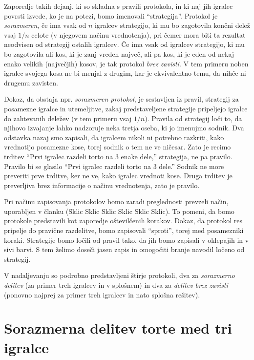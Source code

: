 \documentclass[a4paper,12pt]{article}
\begin{document}
Zaporedje takih dejanj, ki so skladna s pravili protokola, in ki naj jih igralec povrsti izvede, ko je na potezi, bomo imenovali ``strategija''. Protokol je {\em sorazmeren}, če ima vsak od $n$ igralcev strategijo, ki mu bo zagotovila končni delež vsaj $1/n$ celote (v njegovem načinu vrednotenja), pri čemer mora biti ta rezultat neodvisen od strategij ostalih igralcev. Če ima vsak od igralcev strategijo, ki mu bo zagotovila ali kos, ki je zanj vreden največ, ali pa kos, ki je eden od nekaj enako velikih (največjih) kosov, je tak protokol {\em brez zavisti}. V tem primeru noben igralec svojega kosa ne bi menjal z drugim, kar je ekvivalentno temu, da nihče ni drugemu zavisten.

Dokaz, da obstaja npr. {\em sorazmeren protokol}, je sestavljen iz pravil, strategij za posamezne igralce in utemeljitve, zakaj predstaveljene strategije pripeljejo igralce do zahtevanih deležev (v tem primeru vsaj $1/n$). Pravila od strategij loči to, da njihovo izvajanje lahko nadzoruje neka tretja oseba, ki jo imenujmo sodnik. Dva odstavka nazaj smo zapisali, da igralcem nikoli ni potrebno razkriti, kako vrednotijo posamezne kose, torej sodnik o tem ne ve ničesar. Zato je recimo trditev ``Prvi igralec razdeli torto na 3 enake dele,'' strategija, ne pa pravilo. Pravilo bi se glasilo ``Prvi igralec razdeli torto na 3 dele.'' Sodnik ne more preveriti prve trditve, ker ne ve, kako igralec vrednoti kose. Druga trditev je preverljiva brez informacije o načinu vrednotenja, zato je pravilo.

Pri načinu zapisovanja protokolov bomo zaradi preglednosti prevzeli način, uporabljen v članku (Sklic Sklic Sklic Sklic Sklic Sklic). To pomeni, da bomo protokole predstavili kot zaporedje oštevilčenih korakov. Dokaz, da protokol res pripelje do pravične razdelitve, bomo zapisovali ``sproti'', torej med posamezniki koraki. Strategije bomo ločili od pravil tako, da jih bomo zapisali v oklepajih in v sivi barvi. S tem želimo doseči jasen zapis in omogočiti branje navodil ločeno od strategij.

V nadaljevanju so podrobno predstavljeni štirje protokoli, dva za {\em sorazmerno delitev} (za primer treh igralcev in v splošnem) in dva za {\em delitev brez zavisti} (ponovno najprej za primer treh igralcev in nato splošna rešitev).


\section{Sorazmerna delitev torte med tri igralce}
\end{document}
